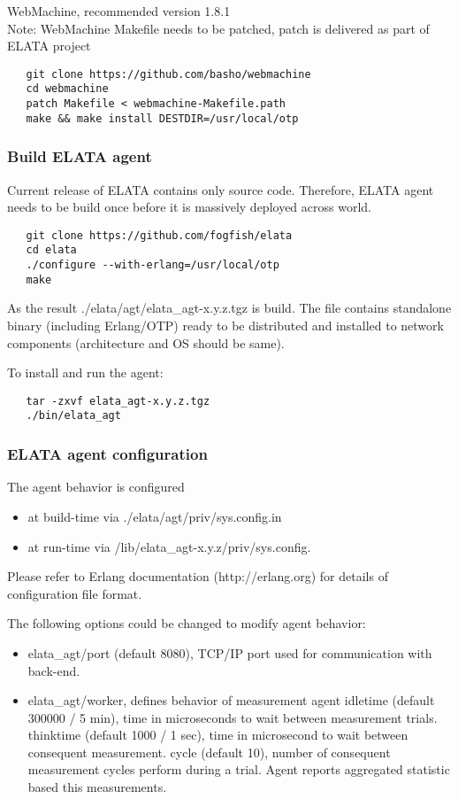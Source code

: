 WebMachine, recommended version 1.8.1 \\
Note: WebMachine Makefile needs to be patched, patch is delivered as part of ELATA project
\begin{verbatim}
   git clone https://github.com/basho/webmachine
   cd webmachine
   patch Makefile < webmachine-Makefile.path
   make && make install DESTDIR=/usr/local/otp
\end{verbatim}


\subsubsection{Build ELATA agent}

Current release of ELATA contains only source code. Therefore, ELATA agent needs to be build once before it is massively deployed across world.    

\begin{verbatim}
   git clone https://github.com/fogfish/elata
   cd elata
   ./configure --with-erlang=/usr/local/otp
   make
\end{verbatim}  

As the result ./elata/agt/elata\_agt-x.y.z.tgz is build. The file contains standalone binary (including Erlang/OTP) ready to be distributed and installed to network components (architecture and OS should be same).


To install and run the agent:
\begin{verbatim}
   tar -zxvf elata_agt-x.y.z.tgz
   ./bin/elata_agt
\end{verbatim}


\subsubsection{ELATA agent configuration}
The agent behavior is configured
\begin{itemize}
\item at build-time via ./elata/agt/priv/sys.config.in
\item at run-time via  /lib/elata\_agt-x.y.z/priv/sys.config.
\end{itemize}
Please refer to Erlang documentation (http://erlang.org) for details of configuration file format.


The following options could be changed to modify agent behavior: 
\begin{itemize}
\item elata\_agt/port (default 8080), TCP/IP port used for communication with back-end.
\item elata\_agt/worker, defines behavior of measurement agent
\subitem idletime (default 300000 / 5 min), time in microseconds to wait between measurement trials. 
\subitem thinktime (default 1000 / 1 sec), time in microsecond to wait between consequent measurement.
\subitem cycle (default 10), number of consequent measurement cycles perform during a trial. Agent reports aggregated statistic based this measurements. 
\end{itemize}


